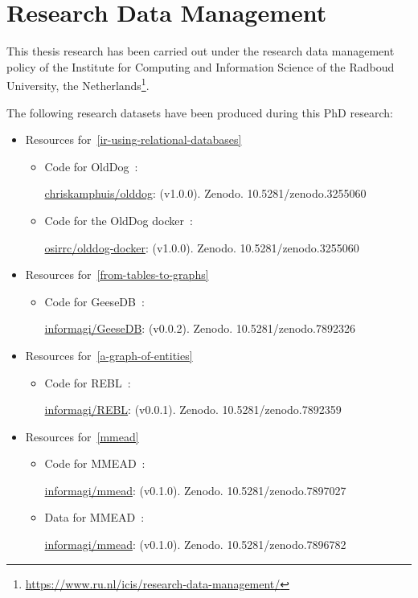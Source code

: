 \chapter*{Research Data Management}
\label{chp:research_data_management}

This thesis research has been carried out under the research data management policy of the Institute for Computing and Information Science of the Radboud University, the Netherlands\footnote{\url{https://www.ru.nl/icis/research-data-management/}}.

The following research datasets have been produced during this PhD research:

\begin{itemize}
	\item Resources for~\cref{ir-using-relational-databases}
	\begin{itemize}
		\item Code for OldDog~\citep{olddog-docker}:
		
		\href{https://doi.org/10.5281/zenodo.7892260}{chriskamphuis/olddog}: (v1.0.0). Zenodo. 10.5281/zenodo.3255060
		
		\item Code for the OldDog docker~\citep{olddog-docker}:
		
		\href{https://doi.org/10.5281/zenodo.3255060}{osirrc/olddog-docker}: (v1.0.0). Zenodo. 10.5281/zenodo.3255060
	\end{itemize}
	
	\item Resources for~\cref{from-tables-to-graphs}
	\begin{itemize}
		\item Code for GeeseDB~\citep{geesedb}:
		
		\href{https://doi.org/10.5281/zenodo.7892326}{informagi/GeeseDB}: (v0.0.2). Zenodo. 10.5281/zenodo.7892326
	\end{itemize}
	
	\item Resources for~\cref{a-graph-of-entities}
	\begin{itemize}
		\item Code for REBL~\citep{rebl}:
		
		\href{https://doi.org/10.5281/zenodo.7892359}{informagi/REBL}: (v0.0.1). Zenodo. 10.5281/zenodo.7892359
	\end{itemize}
	
	\item Resources for~\cref{mmead}
	\begin{itemize}
		\item Code for MMEAD~\citep{mmead}:
		
		\href{https://doi.org/10.5281/zenodo.7897027}{informagi/mmead}: (v0.1.0). Zenodo. 10.5281/zenodo.7897027
		
		\item Data for MMEAD~\citep{mmead}:
		
		\href{https://doi.org/10.5281/zenodo.7896782}{informagi/mmead}: (v0.1.0). Zenodo. 10.5281/zenodo.7896782
	\end{itemize}
	
\end{itemize}